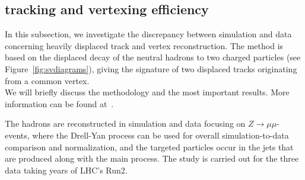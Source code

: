 \subsection{\Displ tracking and vertexing efficiency}
\label{sec:displacedvertex}

In this subsection, we investigate the discrepancy between simulation
and data concerning heavily displaced track and vertex
reconstruction. 
The method is based on the displaced decay of the
neutral hadrons \PKzS to two charged particles (see
Figure~\ref{fig:svdiagrams}), giving the signature of two displaced tracks
originating from a common vertex.\\
We will briefly discuss the methodology
and the most important results. More information can be found at~\cite{AN-20-111_KshortStudy}.

The \PKzS hadrons are reconstructed in simulation and data focusing on $Z\rightarrow \mu\mu$-events, where the Drell-Yan process can be used for overall simulation-to-data comparison and normalization, and the targeted particles occur in the jets that are produced along with the main process. The study is carried out for the three data taking years of LHC's Run2.


